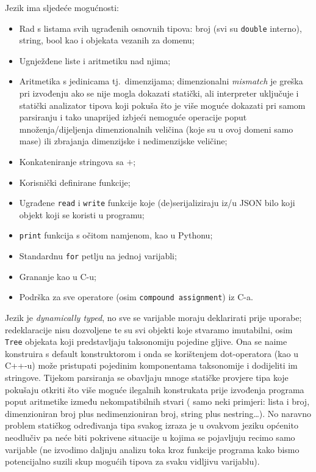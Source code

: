 \documentclass[12pt]{scrartcl}
\begin{document}
Jezik ima sljedeće mogućnosti:
\begin{itemize}
    \item Rad s listama svih ugrađenih osnovnih tipova: broj (svi su \verb|double| interno), string, bool kao i objekata vezanih za domenu;
    \item Ugnježđene liste i aritmetiku nad njima;
    \item Aritmetika s jedinicama tj.\ dimenzijama; dimenzionalni \textsl{mismatch} je greška pri izvođenju ako se nije mogla dokazati statički, ali 
    interpreter uključuje i statički analizator tipova koji pokuša što je više moguće dokazati pri samom parsiranju i tako unaprijed izbjeći nemoguće
    operacije poput množenja/dijeljenja dimenzionalnih veličina (koje su u ovoj domeni samo mase) ili zbrajanja dimenzijske i nedimenzijske veličine;
    \item Konkateniranje stringova sa $+$;
    \item Korisnički definirane funkcije;
    \item Ugrađene \verb|read| i \verb|write| funkcije koje (de)serijaliziraju iz/u JSON bilo koji objekt koji se koristi u programu;
    \item \verb|print| funkcija s očitom namjenom, kao u Pythonu;
    \item Standardnu \verb|for| petlju na jednoj varijabli;
    \item Grananje kao u C-u;
    \item Podrška za sve operatore (osim \verb|compound assignment|) iz C-a.
\end{itemize}
Jezik je \textsl{dynamically typed}, no sve se varijable moraju deklarirati prije uporabe; redeklaracije nisu dozvoljene te su svi objekti koje stvaramo
imutabilni, osim \verb|Tree| objekata koji predstavljaju taksonomiju pojedine gljive. Ona se naime konstruira s default konstruktorom i onda se
korištenjem dot-operatora (kao u C++-u) može pristupati pojedinim komponentama taksonomije i dodijeliti im stringove. Tijekom parsiranja se obavljaju
mnoge statičke provjere tipa koje pokušaju otkriti što više moguće ilegalnih konstrukata prije izvođenja programa
 poput aritmetike između nekompatibilnih stvari (
    samo neki primjeri: lista i broj, dimenzioniran broj plus nedimenzioniran broj, string plus nestring\ldots). No naravno problem statičkog
određivanja tipa svakog izraza je u ovakvom jeziku općenito neodlučiv pa neće biti pokrivene situacije u kojima se pojavljuju recimo samo varijable (ne izvodimo
daljnju analizu toka kroz funkcije programa kako bismo potencijalno suzili skup mogućih tipova za svaku vidljivu varijablu).
\end{document}
